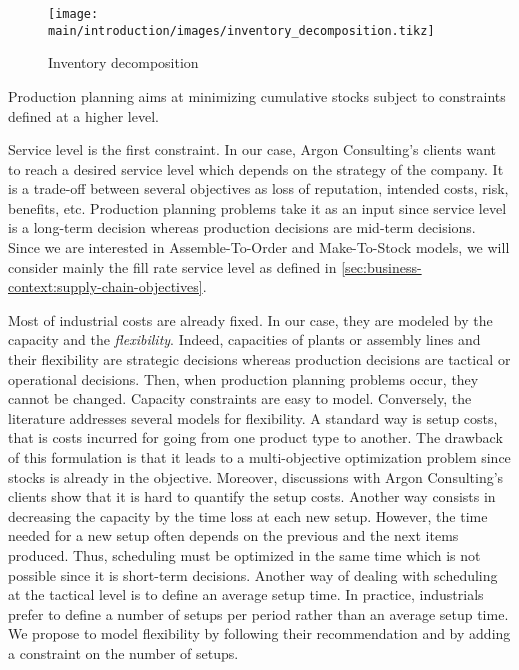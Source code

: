 \begin{figure}[h]
  \centering
  \texttt{[image: main/introduction/images/inventory\_decomposition.tikz]}
  \caption{Inventory decomposition}
  \label{fig:inventory-decomposition}
\end{figure}


\medskip


Production planning aims at minimizing cumulative stocks subject to constraints defined at a higher level.


Service level is the first constraint.
In our case, Argon Consulting's clients want to reach a desired service level which depends on the strategy of the company.
It is a trade-off between several objectives as loss of reputation, intended costs, risk, benefits, etc.
Production planning problems take it as an input since service level is a long-term decision whereas production decisions are mid-term decisions.
Since we are interested in Assemble-To-Order and Make-To-Stock models, we will consider mainly the fill rate service level as defined in \cref{sec:business-context:supply-chain-objectives}.


Most of industrial costs are already fixed.
In our case, they are modeled by the capacity and the \emph{flexibility}.
Indeed, capacities of plants or assembly lines and their flexibility are strategic decisions whereas production decisions are tactical or operational decisions.
Then, when production planning problems occur, they cannot be changed.
Capacity constraints are easy to model.
Conversely, the literature addresses several models for flexibility.
A standard way is setup costs, that is costs incurred for going from one product type to another.
The drawback of this formulation is that it leads to a multi-objective optimization problem since stocks is already in the objective.
Moreover, discussions with Argon Consulting's clients show that it is hard to quantify the setup costs.
Another way consists in decreasing the capacity by the time loss at each new setup.
However, the time needed for a new setup often depends on the previous and the next items produced.
Thus, scheduling must be optimized in the same time which is not possible since it is short-term decisions.
Another way of dealing with scheduling at the tactical level is to define an average setup time.
In practice, industrials prefer to define a number of setups per period rather than an average setup time.
We propose to model flexibility by following their recommendation and by adding a constraint on the number of setups.


